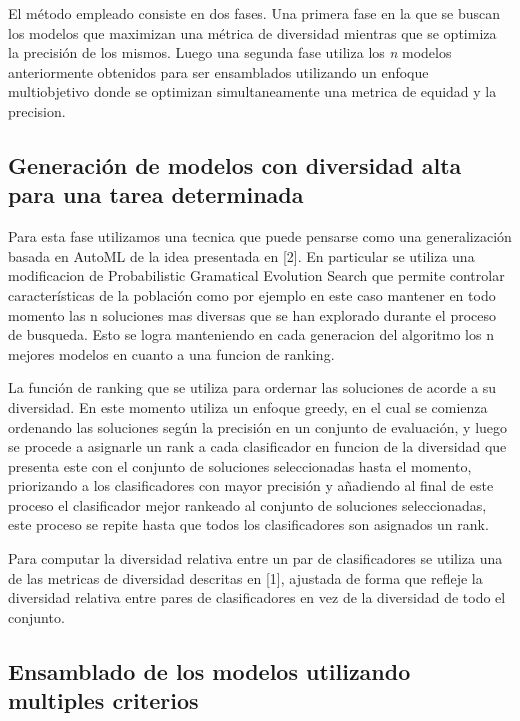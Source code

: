 \documentclass[runningheads,a4paper]{llncs}
\begin{document}
	El método empleado consiste en dos fases. Una primera fase en la que se buscan los modelos que
	maximizan una métrica de diversidad mientras que se optimiza la precisión de los mismos. Luego una
	segunda fase utiliza los \emph{n} modelos anteriormente obtenidos para ser ensamblados utilizando un
	enfoque multiobjetivo donde se optimizan simultaneamente una metrica de equidad y la precision.
	
	\subsection*{Generación de modelos con diversidad alta para una tarea determinada}
	
	Para esta fase utilizamos una tecnica que puede pensarse como una generalización basada en AutoML de
	la idea presentada en [2]. En particular se utiliza una modificacion de
	Probabilistic Gramatical Evolution Search que permite controlar características de la población como
	por ejemplo en este caso mantener en todo momento las n soluciones mas diversas que se han explorado
	durante el proceso de busqueda. Esto se logra manteniendo en cada generacion del algoritmo los n mejores
	modelos en cuanto a una funcion de ranking.
	
	La función de ranking que se utiliza para ordernar las soluciones de acorde a su diversidad. En este
	momento utiliza un enfoque greedy, en el cual se comienza ordenando las soluciones según la precisión
	en un conjunto de evaluación, y luego se procede a asignarle un rank a cada clasificador en funcion
	de la diversidad que presenta este con el conjunto de soluciones seleccionadas hasta el momento,
	priorizando a los clasificadores con mayor precisión y añadiendo al final de este proceso el
	clasificador mejor rankeado al conjunto de soluciones seleccionadas, este proceso se repite hasta
	que todos los clasificadores son asignados un rank.
	
	Para computar la diversidad relativa entre un par de clasificadores se utiliza una de las metricas
	de diversidad descritas en [1], ajustada de forma que refleje la diversidad
	relativa entre pares de clasificadores en vez de la diversidad de todo el conjunto.
	
	\subsection*{Ensamblado de los modelos utilizando multiples criterios}
\end{document}
